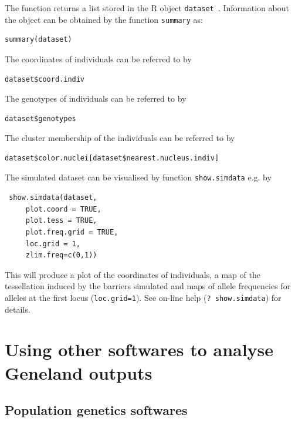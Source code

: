 \documentclass{article}
\begin{document}
The function returns a list stored in the R object {\tt dataset }.
Information about the object can be obtained by the function {\tt summary} as:

\begin{verbatim}
summary(dataset)
\end{verbatim}



The coordinates of individuals can be referred to by 

\begin{verbatim}
dataset$coord.indiv
\end{verbatim}



The genotypes of individuals can be referred to by 

\begin{verbatim}
dataset$genotypes
\end{verbatim}



The cluster membership of the individuals can be referred to by 

\begin{verbatim}
dataset$color.nuclei[dataset$nearest.nucleus.indiv]
\end{verbatim}





The simulated dataset can be visualised by function {\tt show.simdata} e.g. by

\begin{verbatim}
 show.simdata(dataset,
     plot.coord = TRUE,
     plot.tess = TRUE,
     plot.freq.grid = TRUE,
     loc.grid = 1,
     zlim.freq=c(0,1))
\end{verbatim}



 This will produce a plot of the coordinates of individuals, a map of the tessellation induced by the barriers simulated and 
maps of allele frequencies for alleles at the first locus ({\tt loc.grid=1}). 
See on-line help ({\tt ? show.simdata}) for details.

\clearpage
\section{Using other softwares to analyse {\sc Geneland} outputs}

\subsection{Population genetics softwares}
\end{document}
